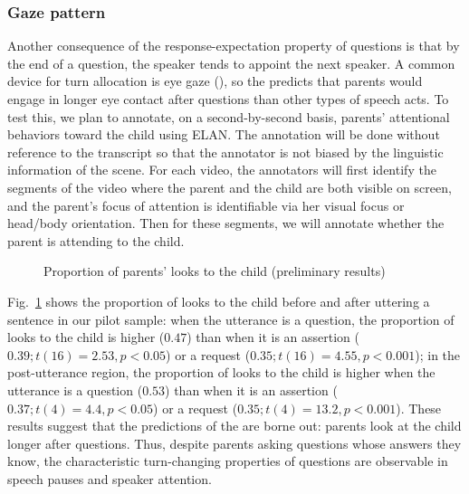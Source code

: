 \subsubsection{Gaze pattern}
\label{sec:engsp:results:gaze}



Another consequence of the response-expectation property of questions is that by the end of a question, the speaker tends to appoint the next speaker. A common device for turn allocation is eye gaze (\citealt{argyle1972gaze, kendon1967gaze,duncan1979gaze, rossano2009gaze}), so the \hypos{} predicts that parents would engage in longer eye contact after questions than other types of speech acts. To test this, we plan to annotate, on a second-by-second basis, parents' attentional behaviors toward the child using ELAN. The annotation will be done without reference to the transcript so that the annotator is not biased by the linguistic information of the scene. For each video, the annotators will first identify the segments of the video where the parent and the child are both visible on screen, and the parent’s focus of attention is identifiable via her visual focus or head/body orientation. Then for these segments, we will annotate whether the parent is attending to the child.  


\begin{figure}[H]
\label{fg:attention}
\begin{center}
	\caption{Proportion of parents' looks to the child (preliminary results)}
\end{center}
\end{figure}


Fig.~\ref{fg:attention} shows the proportion of looks to the child before and after uttering a sentence in our pilot sample: when the utterance is a question, the proportion of looks to the child is higher ($0.47$) than when it is an assertion ($0.39; t(16) = 2.53, p <0.05$) or a request ($0.35; t(16)= 4.55, p<0.001$); in the post-utterance region, the proportion of looks to the child is higher when the utterance is a question ($0.53$) than when it is an assertion ($0.37; t(4) = 4.4, p<0.05$) or a request ($0.35; t(4) = 13.2, p<0.001$). These results suggest that the predictions of the \hypos{} are borne out: parents look at the child longer after questions. Thus, despite parents asking questions whose answers they know, the characteristic turn-changing properties of questions are observable in speech pauses and speaker attention. 


